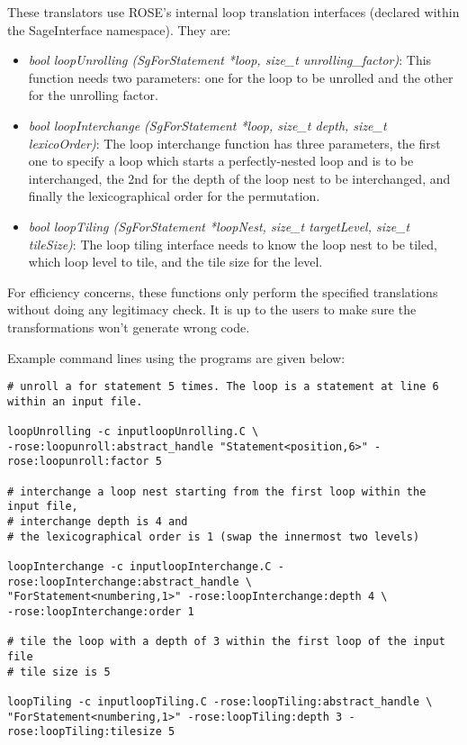 These translators use ROSE's internal loop translation interfaces (declared within the SageInterface namespace). They are:

\begin{itemize}
\item \textit{bool loopUnrolling (SgForStatement *loop, size\_t
unrolling\_factor)}:
This function needs two parameters: one for the loop to be
unrolled and the other for the unrolling factor.
\item \textit{bool  loopInterchange (SgForStatement *loop, size\_t depth,
size\_t lexicoOrder)}:
The loop interchange function has three parameters, the first one to
specify a loop which starts a perfectly-nested loop and is to be
interchanged, the 2nd for the depth of the loop nest to be interchanged, and finally the
lexicographical order for the permutation.
\item \textit{bool  loopTiling (SgForStatement *loopNest, size\_t
targetLevel, size\_t tileSize)}:
The loop tiling interface needs to know the loop nest to be tiled, which
loop level to tile, and the tile size for the level.
\end{itemize}
For efficiency concerns, these functions only perform the specified
translations without doing any legitimacy check.
It is up to the users to
make sure the transformations won't generate wrong code.

Example command lines using the programs are given below:

{\scriptsize
\begin{verbatim}
# unroll a for statement 5 times. The loop is a statement at line 6 within an input file.

loopUnrolling -c inputloopUnrolling.C \
-rose:loopunroll:abstract_handle "Statement<position,6>" -rose:loopunroll:factor 5

# interchange a loop nest starting from the first loop within the input file,
# interchange depth is 4 and
# the lexicographical order is 1 (swap the innermost two levels)

loopInterchange -c inputloopInterchange.C -rose:loopInterchange:abstract_handle \
"ForStatement<numbering,1>" -rose:loopInterchange:depth 4 \
-rose:loopInterchange:order 1

# tile the loop with a depth of 3 within the first loop of the input file
# tile size is 5

loopTiling -c inputloopTiling.C -rose:loopTiling:abstract_handle \
"ForStatement<numbering,1>" -rose:loopTiling:depth 3 -rose:loopTiling:tilesize 5

\end{verbatim}
}

